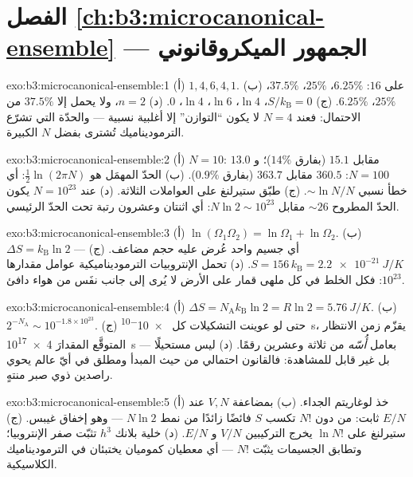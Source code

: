 \section*{الفصل \ref{ch:b3:microcanonical-ensemble} --- الجمهور الميكروقانوني}

\begin{solution}{exo:b3:microcanonical-ensemble:1}
(أ) $1, 4, 6, 4, 1$. (ب) على $16$: $6.25\%$، $25\%$، $37.5\%$،
$25\%$، $6.25\%$. (ج) $S/k_{\text{B}} = 0$، $\ln4$، $\ln6$، $\ln4$،
$0$. (د) $n = 2$، ولا يحمل إلا $37.5\%$ من الاحتمال: فعند
$N = 4$ لا يكون ``التوازن'' إلا أغلبية نسبية --- والحدّة
التي تشرّع الترموديناميك تُشترى بفضل $N$ الكبيرة.
\end{solution}

\begin{solution}{exo:b3:microcanonical-ensemble:2}
(أ) $N = 10$: $13.0$ مقابل $15.1$ (بفارق $14\%$)؛ و $N = 100$:
$360.5$ مقابل $363.7$ (بفارق $0.9\%$). (ب) الحدّ المهمَل هو
$\tfrac12\ln(2\pi N)$: أي خطأ نسبي $\sim\ln N/N$. (ج) طبّق
ستيرلنغ على العواملات الثلاثة. (د) عند $N = 10^{23}$ يكون الحدّ
المطروح $\sim26$ مقابل $N\ln2 \sim 10^{23}$: أي اثنتان وعشرون رتبة
تحت الحدّ الرئيسي.
\end{solution}

\begin{solution}{exo:b3:microcanonical-ensemble:3}
(أ) $\ln(\Omega_1\Omega_2) = \ln\Omega_1 + \ln\Omega_2$. (ب)
$\Delta S = k_{\text{B}}\ln2$ --- أي جسيم واحد عُرض عليه حجم
مضاعف. (ج) $S = 156\,k_{\text{B}} = \qty{2.2e-21}{J/K}$. (د)
تحمل الإنتروبيات الترموديناميكية عوامل مقدارها $10^{23}$: فكل
الخلط في كل ملهى قمار على الأرض لا يُرى إلى جانب نفَس
من هواء دافئ.
\end{solution}

\begin{solution}{exo:b3:microcanonical-ensemble:4}
(أ) $\Delta S = N_{\text{A}}k_{\text{B}}\ln2 = R\ln2 =
\qty{5.76}{J/K}$. (ب) $2^{-N_{\text{A}}} \sim 10^{-1.8\times
10^{23}}$. (ج) حتى لو عوينت التشكيلات كل \qty{e-10}{s}،
يقزّم زمن الانتظار المتوقَّع المقدارَ \qty{4e17}{s} بعامل
\emph{أُسّه} من ثلاثة وعشرين رقمًا. (د) ليس مستحيلًا ---
بل غير قابل للمشاهدة: فالقانون احتمالي من حيث المبدأ ومطلق
في أيّ عالم يحوي راصدين ذوي صبر منتهٍ.
\end{solution}

\begin{solution}{exo:b3:microcanonical-ensemble:5}
(أ) خذ لوغاريتم الجداء. (ب) بمضاعفة $V, N$ عند
$E/N$ ثابت: من دون $N!$ تكسب $S$ فائضًا زائدًا من نمط $N\ln2$
--- وهو إخفاق غيبس. (ج) ستيرلنغ على $\ln N!$ يخرج
التركيبين $V/N$ و $E/N$. (د) خلية بلانك $h^3$ تثبّت
صفر الإنتروبيا؛ وتطابق الجسيمات يثبّت $N!$ --- أي معطيان
كموميان يختبئان في الترموديناميك الكلاسيكية.
\end{solution}

